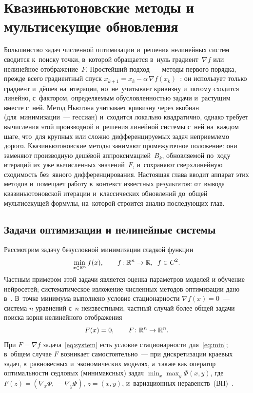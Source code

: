 \chapter{Квазиньютоновские методы и мультисекущие обновления}\label{ch:jacobian}

Большинство задач численной оптимизации и~решения нелинейных систем
сводится к~поиску точки, в~которой обращается в~нуль градиент~$\nabla f$
или нелинейное отображение~$F$. Простейший подход~--- методы первого
порядка, прежде всего градиентный спуск
$x_{k+1}=x_k-\alpha\,\nabla f(x_k)$~\cite{polyak1983,nesterov2010}: он использует только градиент
и~дёшев на~итерации, но~не~учитывает кривизну и~потому сходится
линейно, с~фактором, определяемым обусловленностью задачи и~растущим
вместе с~ней. Метод Ньютона учитывает кривизну через
якобиан (для~минимизации~--- гессиан) и~сходится локально квадратично,
однако требует вычисления этой производной и~решения линейной системы
с~ней на~каждом шаге, что~для крупных или сложно дифференцируемых
задач неприемлемо дорого. Квазиньютоновские методы занимают
промежуточное положение: они заменяют производную дешёвой
аппроксимацией~$B_k$, обновляемой по~ходу итераций из~уже вычисленных
значений~$F$, и~сохраняют сверхлинейную сходимость без~явного
дифференцирования. Настоящая глава вводит аппарат этих методов
и~помещает работу в~контекст известных результатов: от~вывода
квазиньютоновской итерации и~классических обновлений до~общей
мультисекущей формулы, на~которой строится анализ последующих глав.

\section{Задачи оптимизации и нелинейные системы}\label{sec:ch1_setup}

Рассмотрим задачу безусловной минимизации гладкой функции
\begin{equation}\label{eq:min}
  \min_{x\in\mathbb{R}^n} f(x), \qquad f\colon\mathbb{R}^n\to\mathbb{R},\;\; f\in C^2.
\end{equation}
Частным примером этой задачи является оценка параметров моделей и обучение нейросетей; систематическое изложение численных методов оптимизации дано в~\cite{izmailov2008}. В~точке минимума выполнено условие стационарности
$\nabla f(x)=0$~--- система $n$ уравнений с~$n$ неизвестными, частный
случай более общей задачи поиска корня нелинейного отображения
\begin{equation}\label{eq:system}
  F(x) = 0, \qquad F\colon \mathbb{R}^n \to \mathbb{R}^n.
\end{equation}
При $F=\nabla f$ задача~\eqref{eq:system} есть условие стационарности
для~\eqref{eq:min}; в~общем случае $F$ возникает самостоятельно~---
при дискретизации краевых задач, в~равновесных и~экономических моделях,
а~также как оператор оптимальности седловых (минимаксных) задач
$\min_x\max_y \Phi(x,y)$, где $F(z)=(\nabla_x\Phi,\,-\nabla_y\Phi)$,
$z=(x,y)$, и~вариационных неравенств~(ВН)~\cite{viqa2024}.

